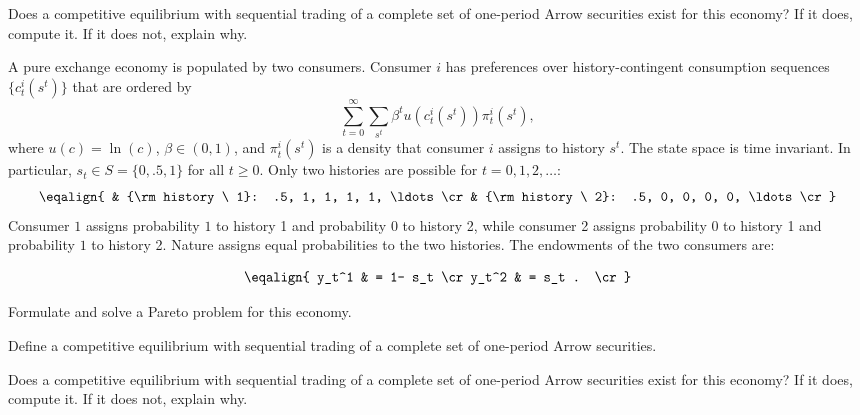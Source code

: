\medskip
{} Does a competitive equilibrium with sequential trading of a complete set of one-period Arrow securities
exist for this economy?  If it does, compute it.  If it does not, explain why.



\medskip
{} 
\medskip
\noindent
 A pure exchange economy is populated by two consumers. Consumer $i$ has preferences over history-contingent
consumption sequences $\{c_t^i(s^t)\}$ that are ordered by
$$ \sum_{t=0}^\infty \sum_{s^t} \beta^t u(c_t^i(s^t)) \pi_t^i (s^t) ,$$
where $u(c) = \ln(c)$, $\beta \in (0,1)$,   and $\pi_t^i(s^t)$ is a density that consumer $i$ assigns to history $s^t$. The state space is time invariant. In particular,
$s_t \in S = \{0, .5,  1\}$ for all $t \geq 0$.
Only two histories are possible for $t=0, 1, 2, \ldots$:
$$ \eqalign{ & {\rm history \ 1}: .5, 1, 1, 1, 1, \ldots \cr
             & {\rm history \ 2}: .5, 0, 0, 0, 0, \ldots \cr } $$
Consumer $1$ assigns probability $1$ to  history 1  and probability $0$ to history 2, while consumer 2 assigns probability
$0$ to history 1 and probability $1$ to history 2.  Nature assigns equal probabilities to the two histories.
The endowments of the two consumers are:

$$ \eqalign{ y_t^1 & = 1- s_t \cr
          y_t^2 & = s_t . \cr} $$

\medskip
{} Formulate and solve a  Pareto problem for this economy.

\medskip
{} Define a competitive  equilibrium with sequential trading of a complete set of one-period Arrow securities.

\medskip
{} Does a competitive equilibrium with sequential trading of a complete set of one-period Arrow securities
exist for this economy?  If it does, compute it.  If it does not, explain why.


\medskip
{} 

